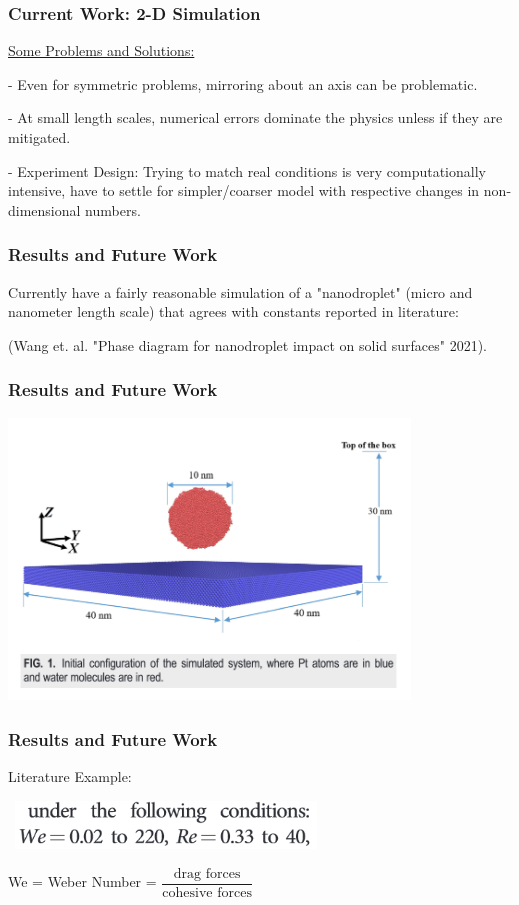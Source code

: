 \documentclass[12pt]{beamer}
\begin{document}
\begin{frame}
    \frametitle{Current Work: 2-D Simulation}
    \underline{Some Problems and Solutions:}

    - Even for symmetric problems, mirroring about an axis can be problematic.

    - At small length scales, numerical errors dominate the physics unless if 
    they are mitigated.
    
    - Experiment Design: Trying to match real conditions is very 
    computationally intensive, have to settle for simpler/coarser model with 
    respective changes in non-dimensional numbers.
\end{frame}

\begin{frame}
    \frametitle{Results and Future Work}
    Currently have a fairly reasonable simulation of a "nanodroplet" (micro and
    nanometer length scale) that agrees with constants reported in literature:
    
    (Wang et. al. "Phase diagram for nanodroplet impact on solid surfaces" 2021).
\end{frame}
\begin{frame}
    \frametitle{Results and Future Work}
    \includegraphics[width=0.8\textwidth]{img/wang-3d.png}
\end{frame}
\begin{frame}
    \frametitle{Results and Future Work}
    Literature Example:

    \
    \includegraphics[width=0.6\textwidth]{img/wang-constants.png}

    We = Weber Number = $\dfrac{\text{drag forces}}{\text{cohesive forces}}$
\end{frame}
\end{document}
